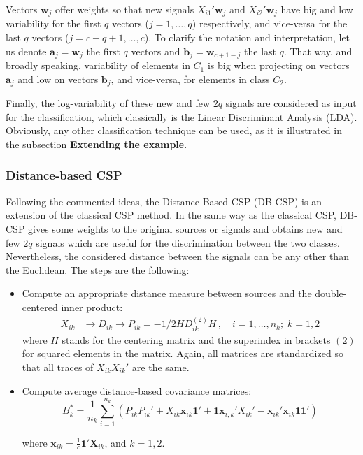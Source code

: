 Vectors $\mathbf{w}_j$ offer weights so that new signals $X_{i 1}'\mathbf{w}_j$  and $X_{i 2}'\mathbf{w}_j$ have big and low variability for the first $q$ vectors ($j=1, \ldots, q$) respectively, and vice-versa for the last $q$ vectors ($j=c-q+1, \ldots, c$). To clarify the notation and interpretation, let us denote $\mathbf{a}_j=\mathbf{w}_j$ the first $q$ vectors and $\mathbf{b}_j=\mathbf{w}_{c+1-j}$ the last $q$. That way, and broadly speaking,  variability of elements in $C_1$ is big when projecting on vectors $\mathbf{a}_j$ and low on vectors $\mathbf{b}_j$, and vice-versa, for elements in class $C_2$.

Finally, the log-variability of these new and few $2q$ signals are considered as input for the classification, which classically is the Linear Discriminant Analysis (LDA). Obviously, any other classification technique can be used, as it is illustrated in the subsection {\bf Extending the example}. 


\subsubsection{Distance-based CSP}
Following the commented ideas, the Distance-Based CSP (DB-CSP) is an extension of the classical CSP method. In the same way as the classical CSP, DB-CSP gives some weights to the original sources or signals and obtains new and few $2q$ signals which are useful for the discrimination between the two classes. Nevertheless, the considered distance between the signals can be any other than the Euclidean. The steps are the following:

\begin{itemize}
\item  Compute an appropriate distance measure between sources and the double-centered inner product:
\begin{align*} 
X_{i k} & \rightarrow D_{i k} \rightarrow  P_{ i k}=-1/2HD_{i k}^{(2)}H \, , \quad i=1,\ldots, n_k; \; k=1,2
\end{align*}
where $H$ stands for the centering matrix and the superindex in brackets $(2)$ for squared elements in the matrix. Again, all matrices are standardized so that all traces of $X_{ik}X_{ik}'$ are the same.


\item Compute average  distance-based covariance matrices:
$$B_k^* = \frac{1}{n_k}\sum_{i=1}^{n_k}\left(P_{ i k}P_{ i k}' + X_{i k}\mathbf{x}_{i k}\mathbf{1}' + \mathbf{1}\mathbf{x}_{i,k}'X_{i k}' - \mathbf{x}_{i k}'\mathbf{x}_{i k}\mathbf{1}\mathbf{1}' \right)$$

where $\mathbf{x}_{i k} = \frac{1}{c}\mathbf{1}'\mathbf{X}_{i k}$, and $k=1, 2$.
\end{itemize}


